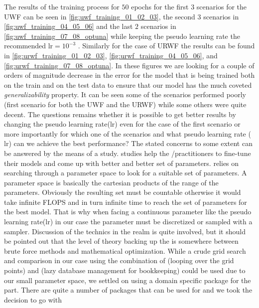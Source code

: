 The results of the training process for $50$ epochs for the first $3$ scenarios for the \ac{UWF} can be seen in \cref{fig:uwf_training_01_02_03}, the second $3$ scenarios in \cref{fig:uwf_training_04_05_06} and the 
last $2$ scenarios in \cref{fig:uwf_training_07_08_optuna} while keeping the pseudo learning rate the recommended $\mathrm{lr}=10^{-3}$ \cite{Kingma2014}\cite{Sun2019}. 
Similarly for the case of \ac{URWF} the results can be found in \cref{fig:urwf_training_01_02_03}, \cref{fig:urwf_training_04_05_06}, and \cref{fig:urwf_training_07_08_optuna}. 
In these figures we are looking for a couple of orders of magnitude decrease in the error for the model that is being trained both on the train 
and on the test data to ensure that our model has the much coveted \emph{generalizability} property. It can be seen some of the 
scenarios performed poorly (first scenario for both the \ac{UWF} and the \ac{URWF}) while some others were quite decent. The questions remains whether it is possible 
to get better results by changing the pseudo learning rate($\mathrm{lr}$) even for the case of the first scenario or more importantly 
for which one of the scenarios and what pseudo learning rate ($\mathrm{lr}$) can we achieve the best performance? The stated concerns to some extent can be answered by the means of a 
\ho \cite{Hutter2019}\cite{Akiba2019} study. \HO studies help the \ml/\dl practitioners to fine-tune their models and come up with better and better set of 
parameters. \HO relies on searching through a parameter space to look for a suitable set of parameters. A parameter space is basically the cartesian 
products of the range of the parameters. Obviously the resulting set must be countable otherwise it would take infinite FLOPS and in turn infinite time to 
reach the set of parameters for the best model. That is why when facing a continuous parameter like the pseudo learning rate($\mathrm{lr}$) 
in our case the parameter must be discretized or sampled with a sampler. Discussion of the technics in the \ho realm is quite 
involved, but it should be pointed out that the level of theory backing up the \ho is somewhere between brute force methods and mathematical optimization. 
While a crude grid search and comparison in our case using the combination of \bash\cite{Ramey2022}\index{\bash} (looping over 
the grid points) and \awk\cite{Robbins2023}\index{\awk} (lazy database management for bookkeeping) could be used due to our 
small parameter space, we settled on using a domain specific package for the \ho\cite{Hutter2019}\cite{Akiba2019}\index{\ho} 
part. There are quite a number of packages that can be used for \ho\cite{Hutter2019}\cite{Akiba2019}\index{\ho} and we took the decision to go with 
